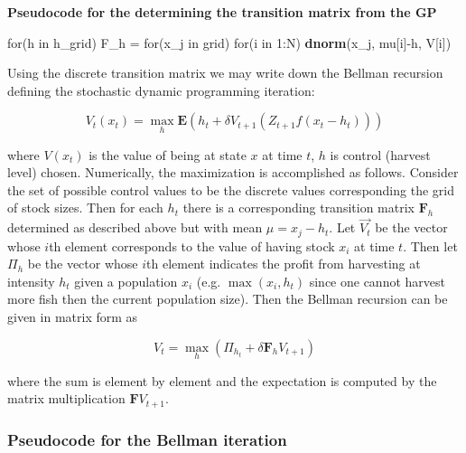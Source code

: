 \documentclass[author-year, review]{elsarticle} %
\newenvironment{Shaded}{}{}
\newcommand{\KeywordTok}[1]{\textcolor[rgb]{0.00,0.44,0.13}{\textbf{{#1}}}}
\newcommand{\DecValTok}[1]{\textcolor[rgb]{0.25,0.63,0.44}{{#1}}}
\newcommand{\StringTok}[1]{\textcolor[rgb]{0.25,0.44,0.63}{{#1}}}
\newcommand{\NormalTok}[1]{{#1}}
\begin{document}
\textbf{Pseudocode for the determining the transition matrix from the
GP}

\begin{Shaded}
\begin{Highlighting}[]
\NormalTok{for(h in h_grid)}
  \NormalTok{F_h =}\StringTok{ }\NormalTok{for(x_j in grid)}
          \NormalTok{for(i in }\DecValTok{1}\NormalTok{:N) }
            \KeywordTok{dnorm}\NormalTok{(x_j, mu[i]-h, V[i])}
\end{Highlighting}
\end{Shaded}

Using the discrete transition matrix we may write down the Bellman
recursion defining the stochastic dynamic programming iteration:

\begin{equation}
V_t(x_t) = \max_h \mathbf{E} \left( h_t + \delta V_{t+1}( Z_{t+1} f(x_t - h_t)) \right)
\end{equation}

where $V(x_t)$ is the value of being at state $x$ at time $t$, $h$ is
control (harvest level) chosen. Numerically, the maximization is
accomplished as follows. Consider the set of possible control values to
be the discrete values corresponding the grid of stock sizes. Then for
each $h_t$ there is a corresponding transition matrix $\mathbf{F}_h$
determined as described above but with mean $\mu = x_j - h_t$. Let
$\vec{V_t}$ be the vector whose $i$th element corresponds to the value
of having stock $x_i$ at time $t$. Then let $\Pi_h$ be the vector whose
$i$th element indicates the profit from harvesting at intensity $h_t$
given a population $x_i$ (e.g. $\max(x_i, h_t)$ since one cannot harvest
more fish then the current population size). Then the Bellman recursion
can be given in matrix form as

\[V_{t} = \max_h \left( \Pi_{h_{t}} + \delta \mathbf{F}_h V_{t+1} \right)\]

where the sum is element by element and the expectation is computed by
the matrix multiplication $\mathbf{F} V_{t+1}$.

\subsubsection{Pseudocode for the Bellman iteration}
\end{document}
